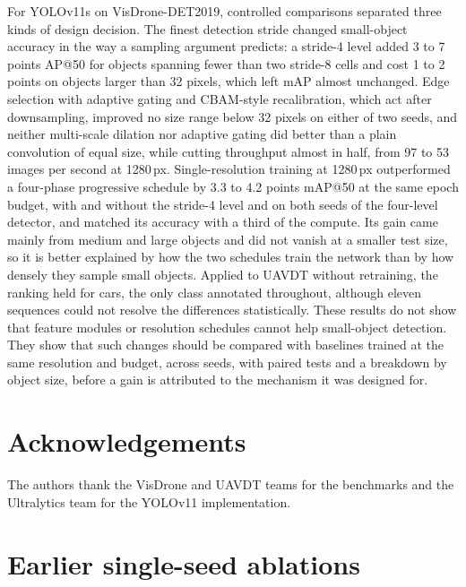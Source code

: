 \documentclass[preprint,12pt]{elsarticle}
\begin{document}
For YOLOv11s on VisDrone-DET2019, controlled comparisons separated three kinds of
design decision. The finest detection stride changed small-object accuracy in the
way a sampling argument predicts: a stride-4 level added 3 to 7 points AP@50 for
objects spanning fewer than two stride-8 cells and cost 1 to 2 points on objects
larger than 32 pixels, which left mAP almost unchanged. Edge selection with
adaptive gating and CBAM-style recalibration, which act after downsampling,
improved no size range below 32 pixels on either of two seeds, and neither
multi-scale dilation nor adaptive gating did better than a plain convolution of
equal size, while cutting throughput almost in half, from 97 to 53 images per
second at 1280\,px.
Single-resolution training at 1280\,px outperformed a four-phase
progressive schedule by 3.3 to 4.2 points mAP@50 at the same epoch budget, with and
without the stride-4 level and on both seeds of the four-level detector, and
matched its accuracy with a third of the compute.
Its gain came mainly from medium and large objects and did not vanish at a smaller
test size, so it is better explained by how the two schedules train the network
than by how densely they sample small objects. Applied to UAVDT without retraining,
the ranking held for cars, the only class annotated throughout, although eleven
sequences could not resolve the differences statistically. These results do not show that feature modules
or resolution schedules cannot help small-object detection. They show that such
changes should be compared with baselines trained at the same resolution and
budget, across seeds, with paired tests and a breakdown by object size, before a
gain is attributed to the mechanism it was designed for.

\section*{Acknowledgements}
The authors thank the VisDrone and UAVDT teams for the benchmarks and the
Ultralytics team for the YOLOv11 implementation.

\appendix
\section{Earlier single-seed ablations}
\label{app:early}
\end{document}
